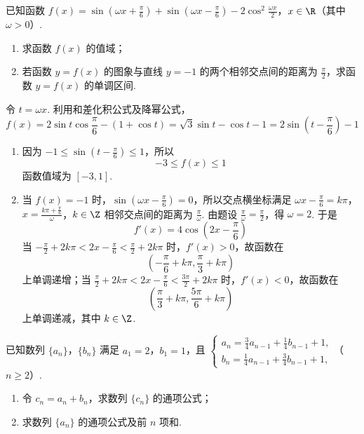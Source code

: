 \begin{problem}
已知函数 \(f(x)=\sin\left(\omega x+\frac{\pi}{6}\right)+\sin\left(\omega x-\frac{\pi}{6}\right)-2\cos^2\frac{\omega x}{2}\)，\(x\in\R\)（其中 \(\omega>0\)）.

\begin{enumerate}
\item 求函数 \(f(x)\) 的值域；
\item 若函数 \(y=f(x)\) 的图象与直线 \(y=-1\) 的两个相邻交点间的距离为 \(\frac{\pi}{2}\)，求函数 \(y=f(x)\) 的单调区间.
\end{enumerate}
\end{problem}

\begin{solution}
令 \(t=\omega x\). 利用和差化积公式及降幂公式，
\[
f(x)=2\sin t\cos\frac{\pi}{6}-\left(1+\cos t\right)=\sqrt{3}\sin t-\cos t-1=2\sin\left(t-\frac{\pi}{6}\right)-1
\]
\begin{enumerate}
\item 因为 \(-1\leqslant\sin\left(t-\frac{\pi}{6}\right)\leqslant1\)，所以
\[
-3\leqslant f(x)\leqslant1
\]
函数值域为 \([-3,1]\).
\item 当 \(f(x)=-1\) 时，\(\sin\left(\omega x-\frac{\pi}{6}\right)=0\)，所以交点横坐标满足
\(\omega x-\frac{\pi}{6}=k\pi\)，\(x=\frac{k\pi+\frac{\pi}{6}}{\omega}\)，\(k\in\Z\)
相邻交点间的距离为 \(\frac{\pi}{\omega}\). 由题设 \(\frac{\pi}{\omega}=\frac{\pi}{2}\)，得 \(\omega=2\). 于是
\[
f'(x)=4\cos\left(2x-\frac{\pi}{6}\right)
\]
当 \(-\frac{\pi}{2}+2k\pi<2x-\frac{\pi}{6}<\frac{\pi}{2}+2k\pi\) 时，\(f'(x)>0\)，故函数在
\[
\left(-\frac{\pi}{6}+k\pi,\frac{\pi}{3}+k\pi\right)
\]
上单调递增；当 \(\frac{\pi}{2}+2k\pi<2x-\frac{\pi}{6}<\frac{3\pi}{2}+2k\pi\) 时，\(f'(x)<0\)，故函数在
\[
\left(\frac{\pi}{3}+k\pi,\frac{5\pi}{6}+k\pi\right)
\]
上单调递减，其中 \(k\in\Z\).
\end{enumerate}
\end{solution}

\begin{problem}
已知数列 \(\{a_n\}\)，\(\{b_n\}\) 满足 \(a_1=2\)，\(b_1=1\)，且 \(\begin{cases}
a_n=\frac{3}{4}a_{n-1}+\frac{1}{4}b_{n-1}+1,\\
b_n=\frac{1}{4}a_{n-1}+\frac{3}{4}b_{n-1}+1,
\end{cases}\)（\(n\geqslant2\)）.

\begin{enumerate}
\item 令 \(c_n=a_n+b_n\)，求数列 \(\{c_n\}\) 的通项公式；
\item 求数列 \(\{a_n\}\) 的通项公式及前 \(n\) 项和.
\end{enumerate}
\end{problem}

